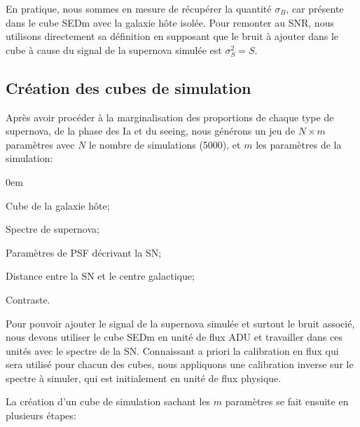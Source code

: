 \documentclass[../main/main.tex]{subfiles}
\begin{document}
En pratique, nous sommes en mesure de récupérer la quantité
$\sigma_{B}$, car présente dans le cube SEDm avec la galaxie hôte
isolée. Pour remonter au SNR, nous utilisons directement sa définition
en supposant que le bruit à ajouter dans le cube à cause du signal de la
supernova simulée est $\sigma_{S}^{2}=S$.

\subsection{Création des cubes de simulation}

Après avoir procéder à la marginalisation des proportions de chaque type
de supernova, de la phase des Ia et du seeing, nous générons un jeu de
$N\times m$ paramètres avec $N$ le nombre de simulations (5000), et $m$
les paramètres de la simulation:\\

\begin{itemize}[label=$\diamondsuit$]
  \itemsep0em
 \begin{samepage}
\item Cube de la galaxie hôte;
\item Spectre de supernova;
\item Paramètres de PSF décrivant la SN;
\item Distance entre la SN et le centre galactique;
\item  Contraste.
  \end{samepage}
\end{itemize}

Pour pouvoir ajouter le signal de la supernova simulée et surtout le
bruit associé, nous devons utiliser le cube SEDm en unité de flux
ADU et travailler dans ces unités avec le spectre de la SN.
Connaissant a priori la calibration en flux qui sera utilisé pour chacun des
cubes, nous appliquons une calibration inverse sur le spectre à simuler,
qui est initialement en unité de flux physique.

La création d'un cube de simulation sachant les $m$ paramètres se fait ensuite en plusieurs étapes:
\end{document}

